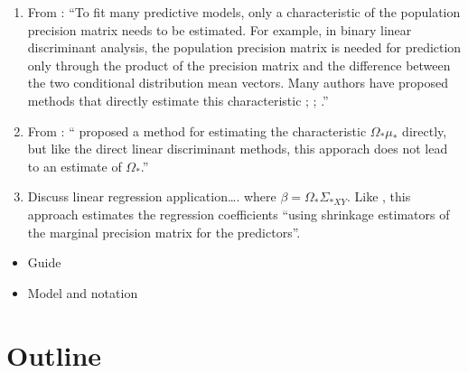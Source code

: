\documentclass[11pt,]{report}
\begin{document}
\begin{enumerate}
\def\labelenumi{\arabic{enumi}.}
\item
  From \citet{molstad2017shrinking}: ``To fit many predictive models, only a characteristic of the population precision matrix needs to be estimated. For example, in binary linear discriminant analysis, the population precision matrix is needed for prediction only through the product of the precision matrix and the difference between the two conditional distribution mean vectors. Many authors have proposed methods that directly estimate this characteristic \citet{cai2011direct}; \citet{fan2012road}; \citet{mai2012direct}.''
\item
  From \citet{molstad2017shrinking}: ``\citet{chen2016regularized} proposed a method for estimating the characteristic \(\Omega_{*}\mu_{*}\) directly, but like the direct linear discriminant methods, this apporach does not lead to an estimate of \(\Omega_{*}\).''
\item
  Discuss linear regression application\ldots{}. where \(\beta = \Omega_{*}\Sigma_{*XY}\). Like \citet{witten2009covariance}, this approach estimates the regression coefficients ``using shrinkage estimators of the marginal precision matrix for the predictors''.
\end{enumerate}

\begin{itemize}
\item
  Guide
\item
  Model and notation
\end{itemize}

\hypertarget{outline}{%
\section{Outline}\label{outline}}
\end{document}
